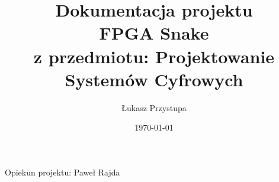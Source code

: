 \documentclass[12pt]{article}
\title{Dokumentacja projektu\\ \textbf{FPGA Snake} {\small \\ z przedmiotu: Projektowanie Systemów Cyfrowych}}
\author{Łukasz Przystupa}
\date{\today}
\numberwithin{equation}{section}
\begin{document}
    \begin{titlepage}
        \maketitle
        \thispagestyle{empty}
        \begin{center}
            Opiekun projektu: Paweł Rajda
        \end{center}
    \end{titlepage}

    
    
    
    
    
\end{document}
